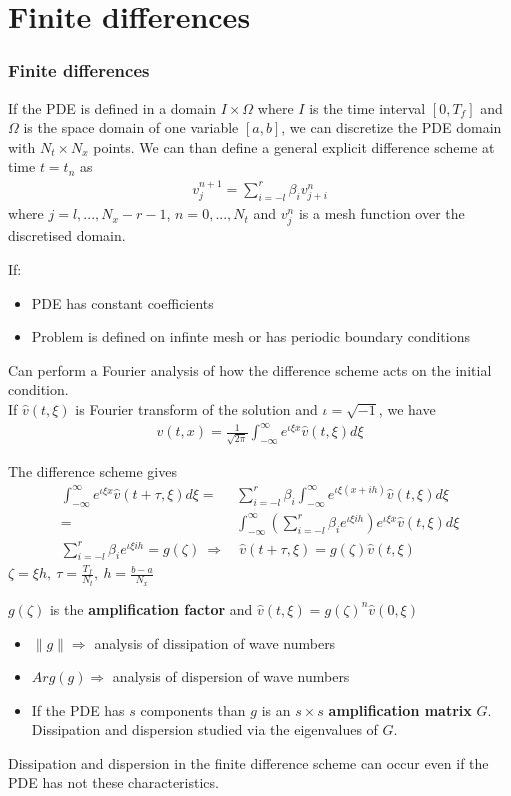 \documentclass{beamer}
\begin{document}
\section{Finite differences}
\begin{frame}
\frametitle{Finite differences}
If the PDE is defined in a domain $I \times \Omega$ where $I$ is the time interval $[0, T_f]$ and $\Omega$ is the space domain of one variable $[a,b]$, we can discretize the PDE domain with $N_t \times N_x$ points. We can than define a general explicit difference scheme at time $t = t_n$ as
\begin{align*}
v_j^{n+1} = \sum_{i = -l}^r \beta_i v_{j+i}^n
\end{align*}
where $j = l, ..., N_x - r -1$, $n = 0, ..., N_t$ and $v_j^n$ is a mesh function over the discretised domain.
\end{frame}
\begin{frame}
If: \begin{itemize}
\item PDE has constant coefficients
\item Problem is defined on infinte mesh or has periodic boundary conditions
\end{itemize}
Can perform a Fourier analysis of how the difference scheme acts on the initial condition. \\ If $\hat{v}(t,\xi)$ is Fourier transform of the solution and $\iota = \sqrt{-1}$, we have
\begin{align*}
v(t,x) = \frac{1}{\sqrt{2\pi}}\int_{-\infty}^{\infty}e^{\iota\xi x}\hat{v}(t,\xi)d\xi
\end{align*}
\end{frame}
\begin{frame}
The difference scheme gives
\begin{align*}
\int_{-\infty}^{\infty}e^{\iota\xi x}\hat{v}(t + \tau,\xi)d\xi = & \sum_{i=-l}^{r}\beta_i\int_{-\infty}^{\infty}e^{\iota\xi (x + ih)}\hat{v}(t,\xi)d\xi \\
= & \int_{-\infty}^{\infty} \left(\sum_{i=-l}^{r}\beta_i e^{\iota\xi ih}\right) e^{\iota \xi x}\hat{v}(t,\xi)d\xi \\
\sum_{i=-l}^{r}\beta_i e^{\iota\xi ih} = g(\zeta) \ \Rightarrow & \ \hat{v}(t + \tau, \xi) = g(\zeta)\hat{v}(t,\xi)
\end{align*}
$\zeta = \xi h, \ \tau = \frac{T_f}{N_t}, \ h = \frac{b - a}{N_x}$
\end{frame}
\begin{frame}
$g(\zeta)$ is the \textbf{amplification factor} and $\hat{v}(t,\xi) = g(\zeta)^n\hat{v}(0,\xi)$
\begin{itemize}
\setlength\itemsep{1em}
\item $\|g\| \Rightarrow$ analysis of dissipation of wave numbers
\item $Arg(g) \Rightarrow$ analysis of dispersion of wave numbers
\item If the PDE has $s$ components than $g$ is an $s \times s$ \textbf{amplification matrix} $G$. Dissipation and dispersion studied via the eigenvalues of $G$.
\cite{doi:10.1137/1.9780898718911}
\end{itemize}
Dissipation and dispersion in the finite difference scheme can occur even if the PDE has not these characteristics.
\end{frame}
\end{document}
